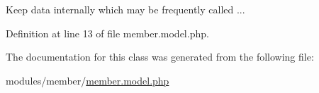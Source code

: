 Keep data internally which may be frequently called ... 



Definition at line 13 of file member.\+model.\+php.



The documentation for this class was generated from the following file\+:\begin{DoxyCompactItemize}
\item 
modules/member/\hyperlink{member_8model_8php}{member.\+model.\+php}\end{DoxyCompactItemize}
